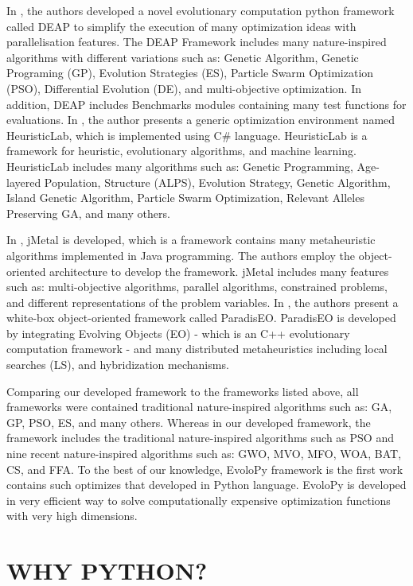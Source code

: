 \documentclass[a4paper,twoside]{article}
\begin{document}
In \cite {DEAP_JMLR2012}, the authors developed a novel evolutionary computation python framework called DEAP to simplify the execution of many optimization ideas with  parallelisation features. The DEAP Framework includes many nature-inspired algorithms with different variations such as: Genetic Algorithm, Genetic Programing (GP), Evolution Strategies (ES), Particle Swarm Optimization (PSO), Differential Evolution (DE), and multi-objective optimization. In addition, DEAP includes Benchmarks modules containing many test functions for evaluations. In \cite{Wagner04}, the author presents a generic optimization environment named HeuristicLab, which is implemented using C\# language. HeuristicLab is a framework for heuristic, evolutionary algorithms, and machine learning. HeuristicLab includes many algorithms such as: Genetic Programming, Age-layered Population, Structure (ALPS), Evolution Strategy, Genetic Algorithm, Island Genetic Algorithm, Particle Swarm Optimization, Relevant Alleles Preserving GA, and many others. 

In \cite{Durillo2011}, jMetal is developed, which is a framework contains many metaheuristic algorithms implemented in Java programming. The authors employ the object-oriented architecture to develop the framework. jMetal includes many features such as: multi-objective algorithms, parallel algorithms, constrained problems, and different representations of the problem variables. In \cite{Cahon2004,humeau13}, the authors present a white-box object-oriented framework called ParadisEO. ParadisEO is developed by integrating Evolving Objects (EO) - which is an C++ evolutionary computation framework - and many distributed metaheuristics including local searches (LS), and hybridization mechanisms.  

Comparing our developed framework to the frameworks listed above, all frameworks were contained traditional nature-inspired algorithms such as: GA, GP, PSO, ES, and many others. Whereas in our developed framework, the framework includes the traditional nature-inspired algorithms such as PSO and nine recent nature-inspired algorithms such as: GWO, MVO, MFO, WOA, BAT, CS, and FFA. To the best of our knowledge, EvoloPy framework is the first work contains such optimizes that developed in Python language. EvoloPy is developed in very efficient way to solve computationally expensive optimization functions with very high dimensions.


\section{\uppercase{Why Python?}}
\end{document}
